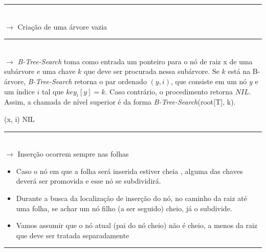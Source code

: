 \documentclass[a4paper, 12pt]{article}
\begin{document}
\rule{12cm}{0.4pt}\\

$\rightarrow$ Criação de uma árvore vazia\\

\begin{algorithmic}[1]
\end{algorithmic}

\rule{12cm}{0.4pt}\\

$\rightarrow$ \textit{B-Tree-Search} toma como entrada um ponteiro para o nó de raiz x de uma subárvore e uma chave $k$ que deve ser
procurada nessa subárvore. Se $k$ está na B-árvore, \textit{B-Tree-Search} retorna o par ordenado $(y, i)$, que consiste em um nó $y$ e um índice $i$ tal que $key_{i}[y] = k$. Caso contrário, o procedimento retorna $NIL$. Assim, a chamada de nível superior é da forma \textit{B-Tree-Search}(root[T], k).\\

\begin{algorithmic}[1]
\EndWhile
{}
	\State \Return (x, i)
	\State \Return NIL
\Else
\EndIf

\State {}
\end{algorithmic}

\rule{12cm}{0.4pt}\\

$\rightarrow$ Inserção ocorrem sempre nas folhas

\begin{itemize}
\item Caso o nó em que a folha será inserida estiver cheia , alguma das chaves deverá ser promovida e esse nó se subdividirá.
\item Durante a busca da localização de inserção do nó, no caminho da raiz até uma folha, se achar um nó filho (a ser seguido) cheio, já o subdivide.
\item Vamos assumir que o nó atual (pai do nó cheio) não é cheio, a menos da raiz que deve ser tratada separadamente
\end{itemize}



\rule{12cm}{0.4pt}\\
\end{document}
